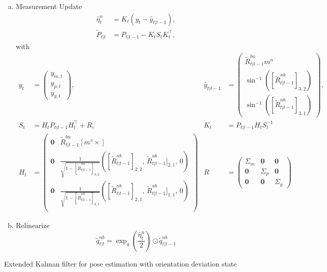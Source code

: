 \documentclass{article}
\begin{document}
\begin{algorithm}
{\begin{enumerate}[(a)]
\begin{align*}
\begin{pmatrix}
    \mathbf{0} &I_3 & -T(R_{t-1}^{nb}  [y_{a,t} \times] \\
    \mathbf{0} &\mathbf{0}  &I_3
    \end{pmatrix}. 
\end{align*}
      \item Measurement Update
      \begin{align}
          \hat{\eta}_t^n &= K_t \left( y_t - \hat{y}_{t|t-1} \right),\\
          \tilde{P}_{t|t} &= P_{t | t-1} - K_t S_t K_t^\top,
      \end{align}
with
    \begin{align*}
        y_t &= \begin{pmatrix}
        y_{m,t} \\
        y_{p,t} \\
        y_{y,t}
        \end{pmatrix},&
        \hat{y}_{t|t-1}  &= \begin{pmatrix}
        \tilde{R}_{t | t-1}^{bn}  m^n\\
        \sin^{-1} \left([\tilde{R}_{t | t-1}^{nb}]_{3,2}\right)\\
        \sin^{-1} \left([\tilde{R}_{t | t-1}^{nb}]_{3,1}\right)
        \end{pmatrix},\\
        S_t &= H_t P_{t | t-1} H_t^\top + R,&
        K_t &= P_{t | t-1} H_t S_{t}^{-1}\\
        H_t &= \begin{pmatrix}
        \mathbf{0} &\tilde{R}_{t | t-1}^{bn} [m^v \times]\\
        \mathbf{0} & \frac{1}{\sqrt{1 - [\tilde{R}_{t | t-1}^{nb}]_{3,2}}} \left([\tilde{R}_{t | t-1}^{nb}]_{2,2}, \, \tilde{R}_{t | t-1}^{nb}]_{2,1},\, 0 \right)\\
         \mathbf{0} & \frac{1}{\sqrt{1 - [\tilde{R}_{t | t-1}^{nb}]_{3,1}}} \left([\tilde{R}_{t | t-1}^{nb}]_{2,1},\, \tilde{R}_{t | t-1}^{nb}]_{1,1},\, 0 \right)\\
        \end{pmatrix}&
        R &= \begin{pmatrix}
        \Sigma_m &\mathbf{0} &\mathbf{0}\\
        \mathbf{0} & \Sigma_p &\mathbf{0}\\
        \mathbf{0} &\mathbf{0} & \Sigma_y 
        \end{pmatrix}
    \end{align*}
    \item Relinearize
    \begin{equation}
        \tilde{q}_{t | t}^{nb} = \exp_q \left( \frac{\hat{\eta}_t^n}{2}\right) \odot \tilde{q}_{t | t -1}^{nb}
    \end{equation}
  \end{enumerate}
}
\caption{Extended Kalman filter for pose estimation with orientation deviation state}
\label{algo:max}
\end{algorithm}
\end{document}

